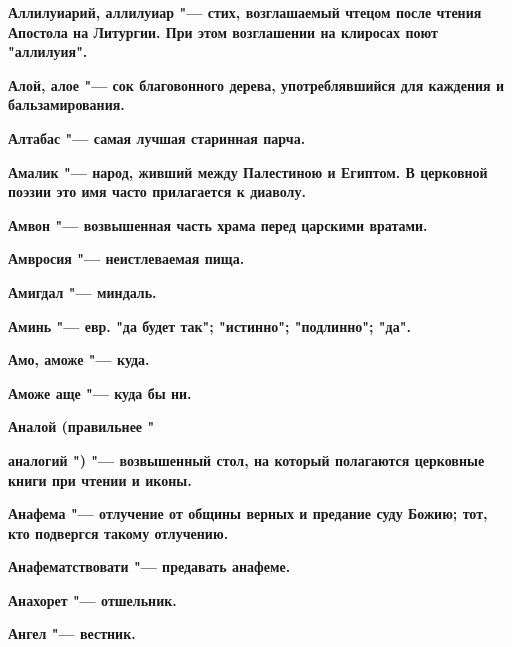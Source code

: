 \bfseries Аллилуиарий, аллилуиар \normalfont{} "--- стих, возглашаемый чтецом после чтения Апостола на Литургии. При этом возглашении на клиросах поют "аллилуия". 




\bfseries Алой, алое \normalfont{} "--- сок благовонного дерева, употреблявшийся для каждения и бальзамирования. 




\bfseries Алтабас \normalfont{} "--- самая лучшая старинная парча. 




\bfseries Амалик \normalfont{} "--- народ, живший между Палестиною и Египтом. В церковной поэзии это имя часто прилагается к диаволу. 




\bfseries Амвон \normalfont{} "--- возвышенная часть храма перед царскими вратами. 




\bfseries Амвросия \normalfont{} "--- неистлеваемая пища. 




\bfseries Амигдал \normalfont{} "--- миндаль. 




\bfseries Аминь \normalfont{} "--- евр. "да будет так"; "истинно"; "подлинно"; "да". 




\bfseries Амо, аможе \normalfont{} "--- куда. 




\bfseries Аможе аще \normalfont{} "--- куда бы ни. 




\bfseries Аналой \normalfont{} (правильнее " 




\bfseries аналогий \normalfont{}") "--- возвышенный стол, на который полагаются церковные книги при чтении и иконы. 




\bfseries Анафема \normalfont{} "--- отлучение от общины верных и предание суду Божию; тот, кто подвергся такому отлучению. 




\bfseries Анафематствовати \normalfont{} "--- предавать анафеме. 




\bfseries Анахорет \normalfont{} "--- отшельник. 




\bfseries Ангел \normalfont{} "--- вестник. 




